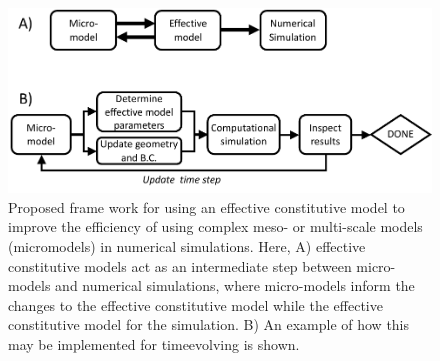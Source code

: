 \begin{figure}
\centering
\includegraphics[width=\textwidth]{Images/chapter5/simulationframework}
\caption{Proposed frame work for using an effective constitutive model to improve the efficiency of using complex meso- or multi-scale models (micro\Hyphdash models) in numerical simulations. Here, A) effective constitutive models act as an intermediate step between micro-models and numerical simulations, where micro-models inform the changes to the effective constitutive model while the effective constitutive model for the simulation. B) An example of how this may be implemented for time\Hyphdash evolving is shown.}
\label{c6:fig:simulationframework}
\end{figure}
    
    